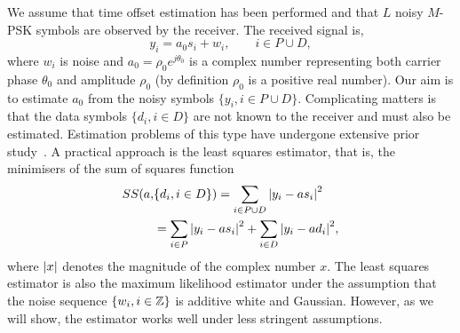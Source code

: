 \documentclass[journal]{IEEEtran}
\begin{document}
We assume that time offset estimation has been performed and that $L$ noisy $M$-PSK symbols are observed by the receiver.  The received signal is,
\begin{equation}\label{eq:sigmod}
y_i = a_0 s_i + w_i, \qquad i \in P \cup D,
\end{equation}
where $w_i$ is noise and $a_0 = \rho_0 e^{j\theta_0}$ is a complex number representing both carrier phase $\theta_0$ and amplitude $\rho_0$ (by definition $\rho_0$ is a positive real number).  Our aim is to estimate $a_0$ from the noisy symbols $\{ y_i, i \in P \cup D \}$.  Complicating matters is that the data symbols $\{d_i, i \in D\}$ are not known to the receiver and must also be estimated.  Estimation problems of this type have undergone extensive prior study~\cite{ViterbiViterbi_phase_est_1983,Cowley_ref_sym_carr_1998,Wilson1989,Makrakis1990,Liu1991,Mackenthun1994,Sweldens2001,McKilliamLinearTimeBlockPSK2009,Divsalar1990}.  A practical approach is the least squares estimator, that is, the minimisers of the sum of squares function
\begin{equation}\label{eq:SSdefn}
\begin{split}
SS(a, &\{d_i, i \in D\}) = \sum_{i \in P \cup D} {\left\vert  y_i - a s_i  \right\vert}^2  \\
&= \sum_{i \in P} {\left\vert  y_i - a s_i  \right\vert}^2 + \sum_{i \in D} {\left\vert  y_i - a d_i  \right\vert}^2,
\end{split}
\end{equation}
where ${\left\vert x \right\vert}$ denotes the magnitude of the complex number $x$.  The least squares estimator is also the maximum likelihood estimator under the assumption that the noise sequence $\{w_i, i \in {\mathbb Z}\}$ is additive white and Gaussian.  However, as we will show, the estimator works well under less stringent assumptions.  %
\end{document}
